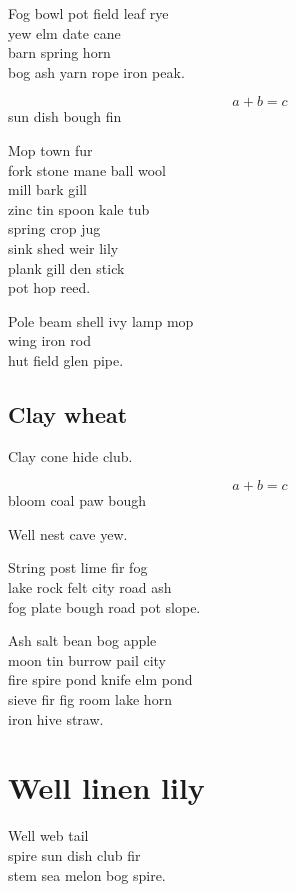 \documentclass{memoir}
\begin{document}
Fog bowl pot field leaf rye \\
yew elm date cane \\
barn spring horn \\
bog ash yarn rope iron peak.

\begin{equation}
  a + b = c
\end{equation}
sun dish bough fin

Mop town fur \\
fork stone mane ball wool \\
mill bark gill \\
zinc tin spoon kale tub \\
spring crop jug \\
sink shed weir lily \\
plank gill den stick \\
pot hop reed.

Pole beam shell ivy lamp mop \\
wing iron rod \\
hut field glen pipe.

\section{Clay wheat}

Clay cone hide club.

\begin{equation}
  a + b = c
\end{equation}
bloom coal paw bough

Well nest cave yew.

String post lime fir fog \\
lake rock felt city road ash \\
fog plate bough road pot slope.

Ash salt bean bog apple \\
moon tin burrow pail city \\
fire spire pond knife elm pond \\
sieve fir fig room lake horn \\
iron hive straw.

\chapter{Well linen lily}

Well web tail \\
spire sun dish club fir \\
stem sea melon bog spire.
\end{document}
